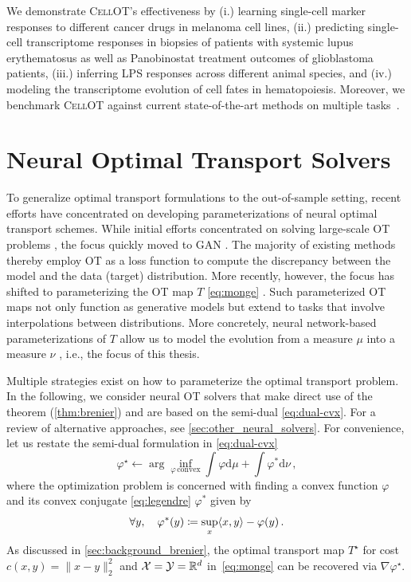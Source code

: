  We demonstrate \textsc{CellOT}'s effectiveness by (i.) learning single-cell marker responses to different cancer drugs in melanoma cell lines, (ii.) predicting single-cell transcriptome responses in biopsies of patients with systemic lupus erythematosus as well as Panobinostat treatment outcomes of glioblastoma patients, (iii.) inferring \acrfull{LPS} responses across different animal species, and (iv.) modeling the transcriptome evolution of cell fates in hematopoiesis. Moreover, we benchmark \textsc{CellOT} against current state-of-the-art methods on multiple tasks~\citep{lopez2018scvi, lotfollahi2019scgen, chen2020dissecting}.

\section{Neural Optimal Transport Solvers} \label{sec:neural_solvers}

To generalize optimal transport formulations to the out-of-sample setting, recent efforts have concentrated on developing parameterizations of neural optimal transport schemes.
While initial efforts concentrated on solving large-scale \acrshort{OT} problems \citep{seguy2018large}, the focus quickly moved to \acrfull{GAN} \citep{arjovsky2017wasserstein, genevay2018learning}.
The majority of existing methods thereby employ \acrshort{OT} as a loss function to compute the discrepancy between the model and the data (target) distribution. 
More recently, however, the focus has shifted to parameterizing the \acrshort{OT} map $T$ \eqref{eq:monge} \citep{yang2018scalable, rout2021generative, daniels2021score}. Such parameterized OT maps not only function as generative models but extend to tasks that involve interpolations between distributions. More concretely, neural network-based parameterizations of $T$ allow us to model the evolution from a measure $\mu$ into a measure $\nu$ \citep{tong2020trajectorynet}, i.e., the focus of this thesis.

Multiple strategies exist on how to parameterize the optimal transport problem.
In the following, we consider neural \acrshort{OT} solvers that make direct use of the \citeauthor{brenier1987decomposition} theorem (\cref{thm:brenier}) and are based on the semi-dual \eqref{eq:dual-cvx}. For a review of alternative approaches, see \cref{sec:other_neural_solvers}.
For convenience, let us restate the semi-dual formulation in \eqref{eq:dual-cvx}
\begin{equation*}
	\varphi^\star \leftarrow \arg\inf_{\varphi\, \text{convex}} \int \varphi \textrm{d}\mu + \int \varphi^*\textrm{d}\nu\,,
\end{equation*}
where the optimization problem is concerned with finding a convex function $\varphi$ and its convex conjugate \eqref{eq:legendre} $\varphi^*$ given by
\begin{equation} \label{eq:varphi_conjugate}
	\forall y, \quad \varphi^*(y) \coloneqq \sup _x \langle x, y\rangle-\varphi(y)\,.	
\end{equation}
As discussed in \cref{sec:background_brenier}, the optimal transport map $T^\star$ for cost $c(x,y) = \|x-y\|^2_2$ and ${\mathcal{X}} = {\mathcal{Y}} = \mathbb{R}^d$ in~\eqref{eq:monge} can be recovered via $\nabla \varphi^\star$.

